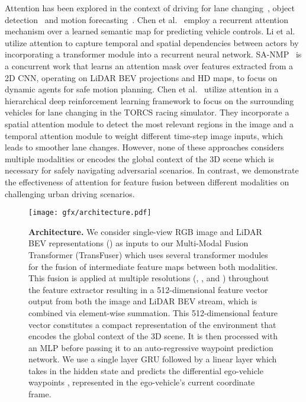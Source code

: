 \documentclass[final]{cvpr}
\newcommand{\boldparagraph}[1]{\vspace{0.1cm}\noindent{\bf #1:}}
\begin{document}
\boldparagraph{Attention for Autonomous Driving} Attention has been explored in the context of driving for lane changing~\cite{Chen2019IROS}, object detection~\cite{Chen2017ARXIVa, Li2020IROS} and motion forecasting~\cite{Li2020IROS, Sadeghian2018ECCV, Sadeghian2019CVPR, Huang2019ICCV, Choi2019ICCV, Kosaraju2019NEURIPS, Ivanovic2019ICCV, Wei2020ARXIV}. Chen et al.~\cite{Chen2017ARXIVa} employ a recurrent attention mechanism over a learned semantic map for predicting vehicle controls. Li et al.~\cite{Li2020IROS} utilize attention to capture temporal and spatial dependencies between actors by incorporating a transformer module into a recurrent neural network. SA-NMP~\cite{Wei2020ARXIV} is a concurrent work that learns an attention mask over features extracted from a 2D CNN, operating on LiDAR BEV projections and HD maps, to focus on dynamic agents for safe motion planning. Chen et al.~\cite{Chen2019IROS} utilize attention in a hierarchical deep reinforcement learning framework to focus on the surrounding vehicles for lane changing in the TORCS racing simulator. They incorporate a spatial attention module to detect the most relevant regions in the image and a temporal attention module to weight different time-step image inputs, which leads to smoother lane changes. However, none of these approaches considers multiple modalities or encodes the global context of the 3D scene which is necessary for safely navigating adversarial scenarios. In contrast, we demonstrate the effectiveness of attention for feature fusion between different modalities on challenging urban driving scenarios.

 \begin{figure*}
\centering
\texttt{[image: gfx/architecture.pdf]}
\caption{\textbf{Architecture.} We consider single-view RGB image and LiDAR BEV representations () as inputs to our Multi-Modal Fusion Transformer (TransFuser) which uses several transformer modules for the fusion of intermediate feature maps between both modalities. This fusion is applied at multiple resolutions (, ,  and ) throughout the feature extractor resulting in a 512-dimensional feature vector output from both the image and LiDAR BEV stream, which is combined via element-wise summation. This 512-dimensional feature vector constitutes a compact representation of the environment that encodes the global context of the 3D scene. It is then processed with an MLP before passing it to an auto-regressive waypoint prediction network. We use a single layer GRU followed by a linear layer which takes in the hidden state and predicts the differential ego-vehicle waypoints , represented in the ego-vehicle's current coordinate frame.}
\label{fig:model}
\vspace{-0.2cm}
\end{figure*}
\end{document}
